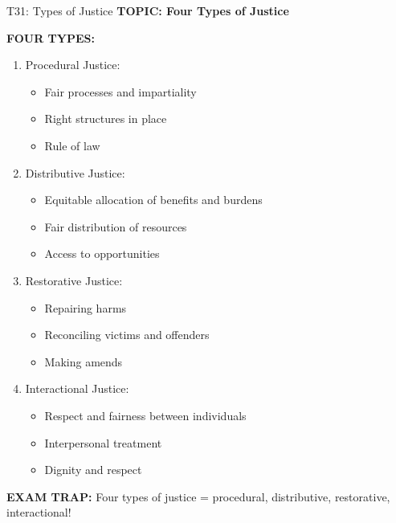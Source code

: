 \documentclass[8pt]{beamer}
\begin{document}
	\begin{frame}{T31: Types of Justice}
		\fontsize{6.5}{7.5}\selectfont
		\textbf{TOPIC: Four Types of Justice}
		
		\vspace{0.1cm}
		\textbf{FOUR TYPES:}
		\begin{enumerate}
			\item \textcolor{myblue}{Procedural Justice:}
			\begin{itemize}
				\item Fair processes and impartiality
				\item Right structures in place
				\item Rule of law
			\end{itemize}
			\item \textcolor{myblue}{Distributive Justice:}
			\begin{itemize}
				\item Equitable allocation of benefits and burdens
				\item Fair distribution of resources
				\item Access to opportunities
			\end{itemize}
			\item \textcolor{myblue}{Restorative Justice:}
			\begin{itemize}
				\item Repairing harms
				\item Reconciling victims and offenders
				\item Making amends
			\end{itemize}
			\item \textcolor{myblue}{Interactional Justice:}
			\begin{itemize}
				\item Respect and fairness between individuals
				\item Interpersonal treatment
				\item Dignity and respect
			\end{itemize}
		\end{enumerate}
		
		\textcolor{myred}{\textbf{EXAM TRAP:}} Four types of justice = \textcolor{myblue}{procedural, distributive, restorative, interactional}!
	\end{frame}
	
\end{document}

